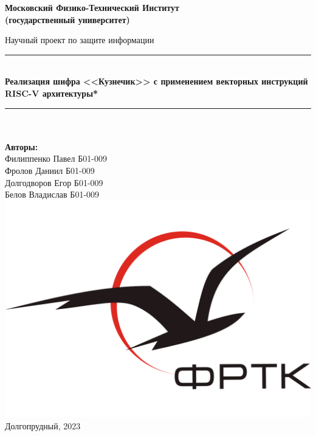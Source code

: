 \newcommand{\HRule}{\rule{\linewidth}{0.7mm}} %
	
	\begin{center}
		\large\textbf{Московский Физико-Технический Институт}\\ %
		\large\textbf{(государственный университет)}
	
		\vfill
		
		\Large Научный проект по защите информации\\[0.5cm] %
		
		
		\HRule
		\\[0.4cm]
		{ \huge \bfseries *Реализация шифра <<Кузнечик>> с применением векторных инструкций RISC-V архитектуры*} %
		\\[0.4cm]
		\HRule
		\\[0.5cm]
		
		\ \\
	\textbf{\large Авторы:} \\
	\large Филиппенко Павел Б01-009\\
        \large Фролов Даниил Б01-009\\
        \large Долгодворов Егор Б01-009\\
        \large Белов Владислав Б01-009\\
		\vfill
		\hspace*{-0.8 cm}\includegraphics[width=100 pt]{../images/frkt_logo}\\ %
		\large Долгопрудный, 2023 %
	\end{center}

\newpage
\setcounter{page}{2}
\fancyfoot[c]{\thepage}
\fancyhead[R]{}